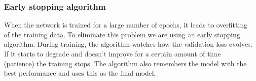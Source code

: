 \subsubsection{Early stopping algorithm}
When the network is trained for a large number of epochs, it leads to overfitting of the training data. To eliminate this problem we are using an early stopping algorithm. During training, the algorithm watches how the validation loss evolves. If it starts to degrade and doesn't improve for a certain amount of time (patience) the training stops. The algorithm also remembers the model with the best performance and uses this as the final model.
